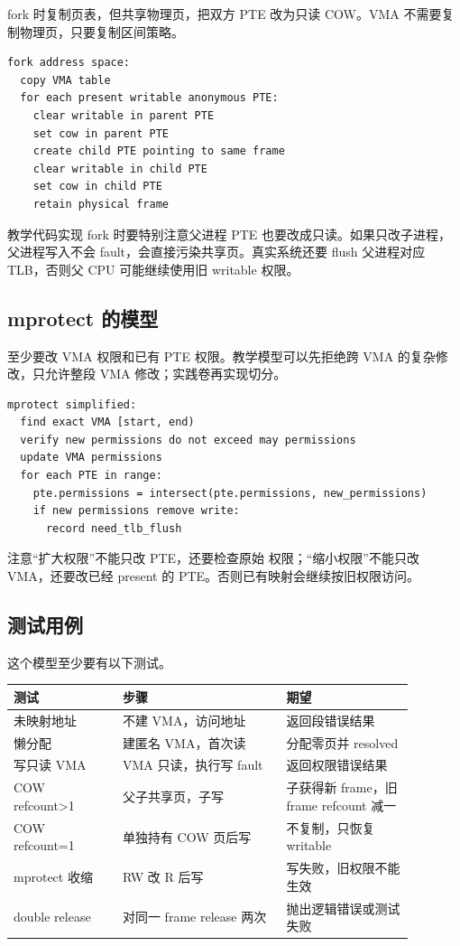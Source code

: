 fork 时复制页表，但共享物理页，把双方 PTE 改为只读 COW。VMA 不需要复制物理页，只要复制区间策略。

\begin{lstlisting}
fork address space:
  copy VMA table
  for each present writable anonymous PTE:
    clear writable in parent PTE
    set cow in parent PTE
    create child PTE pointing to same frame
    clear writable in child PTE
    set cow in child PTE
    retain physical frame
\end{lstlisting}

教学代码实现 fork 时要特别注意父进程 PTE 也要改成只读。如果只改子进程，父进程写入不会 fault，会直接污染共享页。真实系统还要 flush 父进程对应 TLB，否则父 CPU 可能继续使用旧 writable 权限。

\subsection{mprotect 的模型}

 至少要改 VMA 权限和已有 PTE 权限。教学模型可以先拒绝跨 VMA 的复杂修改，只允许整段 VMA 修改；实践卷再实现切分。

\begin{lstlisting}
mprotect simplified:
  find exact VMA [start, end)
  verify new permissions do not exceed may permissions
  update VMA permissions
  for each PTE in range:
    pte.permissions = intersect(pte.permissions, new_permissions)
    if new permissions remove write:
      record need_tlb_flush
\end{lstlisting}

注意“扩大权限”不能只改 PTE，还要检查原始  权限；“缩小权限”不能只改 VMA，还要改已经 present 的 PTE。否则已有映射会继续按旧权限访问。

\subsection{测试用例}

这个模型至少要有以下测试。

\begin{longtable}{|p{0.24\linewidth}|p{0.36\linewidth}|p{0.28\linewidth}|}
\toprule
测试 & 步骤 & 期望 \\
\midrule
未映射地址 & 不建 VMA，访问地址 & 返回段错误结果 \\\tablerowrule
懒分配 & 建匿名 VMA，首次读 & 分配零页并 resolved \\\tablerowrule
写只读 VMA & VMA 只读，执行写 fault & 返回权限错误结果 \\\tablerowrule
COW refcount>1 & 父子共享页，子写 & 子获得新 frame，旧 frame refcount 减一 \\\tablerowrule
COW refcount=1 & 单独持有 COW 页后写 & 不复制，只恢复 writable \\\tablerowrule
mprotect 收缩 & RW 改 R 后写 & 写失败，旧权限不能生效 \\\tablerowrule
double release & 对同一 frame release 两次 & 抛出逻辑错误或测试失败 \\
\bottomrule
\end{longtable}

